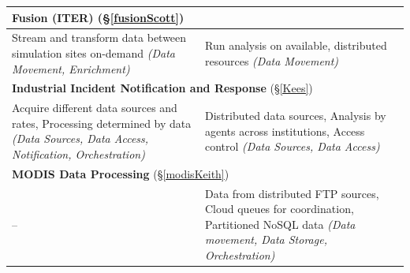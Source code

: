 \begin{table}[h]
\begin{scriptsize}
\begin{center}
\begin{tabular}{|p{6.7cm}|p{6.7cm}|}


 \\

		\hline
\multicolumn{2}{|l|}{{\textbf{Fusion (ITER)} (\S\ref{fusionScott})}} \\ \hline	
	     Stream and transform data between simulation sites on-demand \emph{(Data Movement, Enrichment)}
	    &
Run analysis on available, distributed resources \emph{(Data Movement)} %
            \\
		\hline
\multicolumn{2}{|l|}{{\textbf{Industrial Incident Notification and Response} (\S\ref{Kees})}} \\ \hline	
	     Acquire different data sources and rates, Processing determined by data
             \emph{(Data Sources, Data Access, Notification, Orchestration)}   %
&
Distributed data sources, Analysis by agents across institutions, Access control \emph{(Data Sources, Data
  Access)} %
            \\
		\hline
\multicolumn{2}{|l|}{{\textbf{MODIS Data Processing} (\S\ref{modisKeith})}} \\ \hline	

--


		&
Data from distributed FTP sources, Cloud queues for coordination, Partitioned NoSQL data \emph{(Data
  movement, Data Storage, Orchestration)}
\\
		\hline


\end{tabular}
\end{center}
\end{scriptsize}
\end{table}

